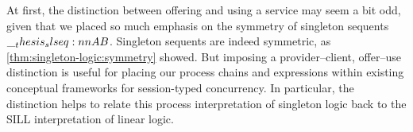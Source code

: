 

At first, the distinction between offering and using a service may seem a bit odd, given that we placed so much emphasis on the symmetry of singleton sequents $\slseq{A |- B}$.
Singleton sequents are indeed symmetric, as \cref{thm:singleton-logic:symmetry} showed.
But imposing a provider--client, offer--use distinction is useful for placing our process chains and expressions within existing conceptual frameworks for session-typed concurrency.
In particular, the distinction helps to relate this process interpretation of singleton logic back to the SILL interpretation of linear logic\autocite{??}.






